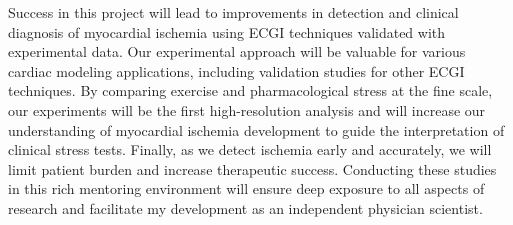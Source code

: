 \begin{desclist}
	
	
\end{desclist}	



Success in this project will lead to improvements
in detection and clinical diagnosis of myocardial ischemia using ECGI
techniques validated with experimental data. Our experimental
approach will be valuable for various cardiac modeling applications,
including validation studies for other ECGI techniques. By comparing
exercise and pharmacological stress at the fine scale, our experiments will be the first high-resolution analysis and will increase our understanding of myocardial ischemia development
to guide the
interpretation of clinical stress tests. Finally, as we detect ischemia
early and accurately, we will limit patient burden and increase therapeutic
success.  Conducting these studies in this rich
mentoring environment will ensure deep exposure to all aspects of research
and facilitate my development as an independent physician scientist.

